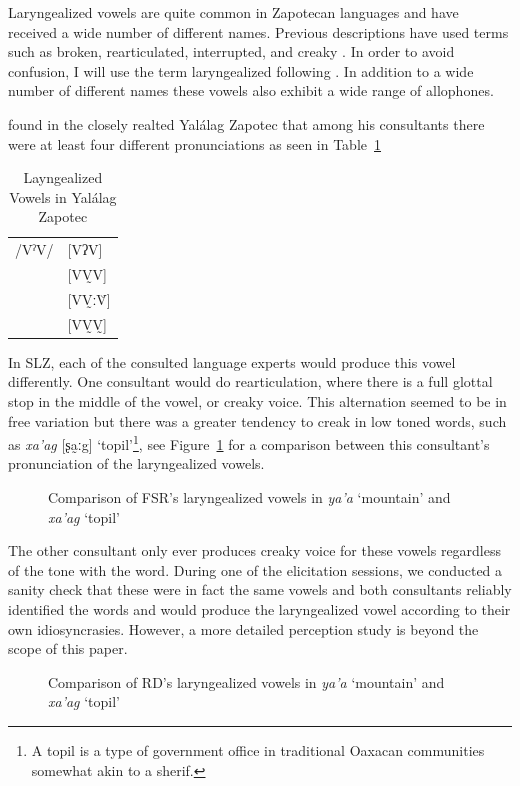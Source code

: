 \documentclass[12pt, letterpaper]{article}
\providecommand{\lsptoprule}{\midrule\toprule}
\providecommand{\lspbottomrule}{\bottomrule\midrule}
\begin{document}
Laryngealized vowels are quite common in Zapotecan languages and have received a wide number of different names. Previous descriptions have used terms such as broken, rearticulated, interrupted, and creaky \citep{longDiccionarioZapotecoSan2005,avelinobecerraTopicsYalalagZapotec2004,avelinoAcousticElectroglottographicAnalyses2010,sonnenscheinDescriptiveGrammarSan2005,adlerAcousticsPhonationTypes2016}. In order to avoid confusion, I will use the term laryngealized following \citet{avelinoAcousticElectroglottographicAnalyses2010}. In addition to a wide number of different names these vowels also exhibit a wide range of allophones. 

\citet{avelinoAcousticElectroglottographicAnalyses2010} found in the closely realted Yalálag Zapotec that among his consultants there were at least four different pronunciations as seen in Table~\ref{tab:laryngeal}
\begin{table}[!h]
	\centering
	\caption{Layngealized Vowels in Yalálag Zapotec}
	\label{tab:laryngeal}
	 \begin{tabular}{ll}
	\lsptoprule
	/VˀV/	&  [VʔV]  \\
			&  [VV̰V]   \\
			&  [VV̰ːV̆]  \\
			&  [VV̰V̰]	\\
	\lspbottomrule
	\end{tabular}
\end{table}
In SLZ, each of the consulted language experts would produce this vowel differently. One consultant would do rearticulation, where there is a full glottal stop in the middle of the vowel, or creaky voice. This alternation seemed to be in free variation but there was a greater tendency to creak in low toned words, such as \textit{xa'ag} [ʂa̰ːg] `topil'\footnote{A topil is a type of government office in traditional Oaxacan communities somewhat akin to a sherif. }, see Figure~\ref{fig:FSRLaryngeal} for a comparison between this consultant's pronunciation of the laryngealized vowels.

\begin{figure}[!h]
	\caption{Comparison of FSR's laryngealized vowels in \textit{ya'a} `mountain' and \textit{xa'ag} `topil'}
	\label{fig:FSRLaryngeal}
\end{figure}

The other consultant only ever produces creaky voice for these vowels regardless of the tone with the word. During one of the elicitation sessions, we conducted a sanity check that these were in fact the same vowels and both consultants reliably identified the words and would produce the laryngealized vowel according to their own idiosyncrasies. However, a more detailed perception study is beyond the scope of this paper. 
\begin{figure}[!h]
	\caption{Comparison of RD's laryngealized vowels in \textit{ya'a} `mountain' and \textit{xa'ag} `topil'}
	\label{fig:RDLaryngeal}
\end{figure}
\end{document}
